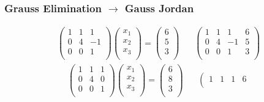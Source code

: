 \documentclass[10pt]{beamer}
\begin{document}
\begin{frame}
  \frametitle{Grauss Elimination $\rightarrow$ Gauss Jordan}
  \[
    \begin{array}{cc}
    \left(
      \begin{array}{rrr}
        1 &  1 &  1\\
        0 &  4 & -1\\
        0 &  0 &  1\\
      \end{array}
    \right)
    \left(
      \begin{array}{r}
        x_1 \\ x_2 \\ x_ 3 \\
      \end{array}
    \right) =
    \left(
      \begin{array}{r}
        6 \\ 5 \\ 3 \\
      \end{array}
    \right)
      & ~~~~
    \left(
      \begin{array}{rrr|r}
        1 &  1 &  1 & 6\\
        0 &  4 & -1 & 5\\
        0 &  0 &  1 & 3\\
      \end{array}
    \right)
    \end{array}
  \] \pause
  \[
    \begin{array}{cc}
    \left(
      \begin{array}{rrr}
        1 &  1 &  1\\
        0 &  4 &  0\\
        0 &  0 &  1\\
      \end{array}
    \right)
    \left(
      \begin{array}{r}
        x_1 \\ x_2 \\ x_ 3 \\
      \end{array}
    \right) =
    \left(
      \begin{array}{r}
        6 \\ 8 \\ 3 \\
      \end{array}
    \right)
      & ~~~~
    \left(
      \begin{array}{rrr|r}
        1 &  1 &  1 & 6\\

\end{array}
\end{array}\]
\end{frame}
\end{document}
